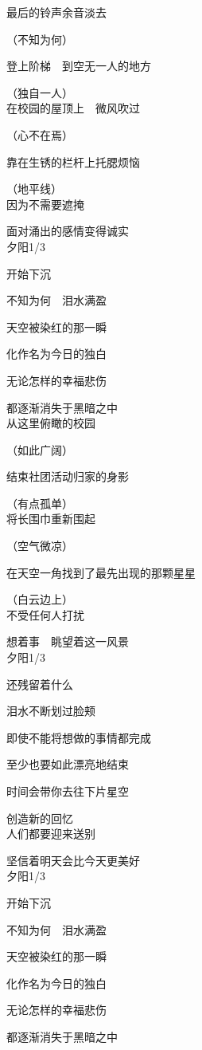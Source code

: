 最后的铃声余音淡去

（不知为何）

登上阶梯　到空无一人的地方

（独自一人）
\\

在校园的屋顶上　微风吹过

（心不在焉）

靠在生锈的栏杆上托腮烦恼

（地平线）
\\

因为不需要遮掩

面对涌出的感情变得诚实
\\

夕阳1/3

开始下沉

不知为何　泪水满盈

天空被染红的那一瞬

化作名为今日的独白

无论怎样的幸福悲伤

都逐渐消失于黑暗之中
\\

从这里俯瞰的校园

（如此广阔）

结束社团活动归家的身影

（有点孤单）
\\

将长围巾重新围起

（空气微凉）

在天空一角找到了最先出现的那颗星星

（白云边上）
\\

不受任何人打扰

想着事　眺望着这一风景
\\

夕阳1/3

还残留着什么

泪水不断划过脸颊

即使不能将想做的事情都完成

至少也要如此漂亮地结束

时间会带你去往下片星空

创造新的回忆
\\

人们都要迎来送别

坚信着明天会比今天更美好
\\

夕阳1/3

开始下沉

不知为何　泪水满盈

天空被染红的那一瞬

化作名为今日的独白

无论怎样的幸福悲伤

都逐渐消失于黑暗之中
\\
